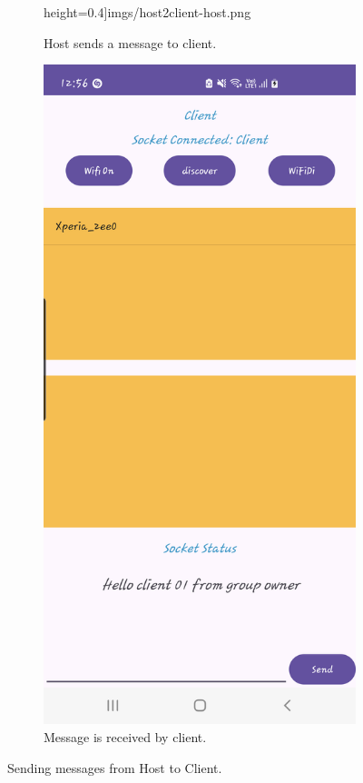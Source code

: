 \begin{figure}
\begin{subfigure}[b]{0.3\textwidth}
            height=0.4\textheight]{imgs/host2client-host.png}
        \caption{Host sends a message to client.}
        \label{hostComm:h}
    \end{subfigure}
    \hspace{1cm}
    \begin{subfigure}[b]{0.3\textwidth}
        \includegraphics[width=\textwidth,
            height=0.4\textheight]{imgs/host2client-client.png}
        \caption{Message is received by client.}
        \label{hostComm:c}
    \end{subfigure}
    \caption{Sending messages from Host to Client.}
    \label{hostComm}
\end{figure}

